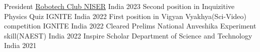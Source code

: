 


\begin{cvhonors}

   \cvhonor
	{President} %
	{\href{https://www.niser.ac.in/~smishra/club/rtc/}{Robotech Club NISER}} %
	{India} %
	{2023} %
	 \cvhonor
	{Second position in Inquizitive Physics Quiz} %
	{IGNITE } %
	{India} %
	{2022} %
	\cvhonor
	{First position in Vigyan Vyakhya(Sci-Video) competition} %
	{IGNITE } %
	{India} %
	{2022} %
	\cvhonor
	{Cleared Prelims} %
	{National Anveshika Experiment skill(NAEST)} %
	{India} %
	{2022} %
  	\cvhonor
	{Inspire Scholar} %
	{Department of Science and Technology} %
	{India} %
	{2021} %


\end{cvhonors}